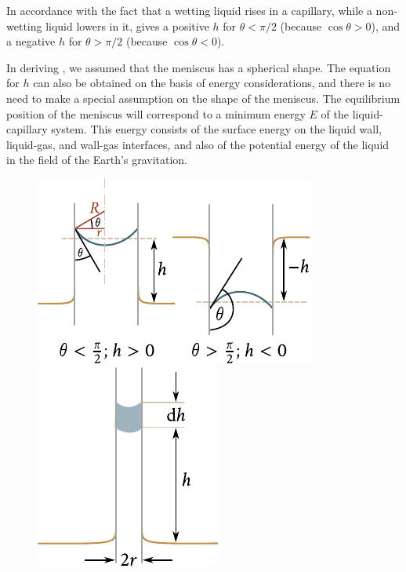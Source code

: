 In accordance with the fact that a wetting liquid rises in a capillary, while a non-wetting liquid lowers in it,  gives a positive $h$ for $\theta<\pi/2$ (because $\cos\theta>0$), and a negative $h$ for $\theta>\pi/2$ (because $\cos\theta<0$).

In deriving , we assumed that the meniscus has a spherical shape. The equation for $h$ can also be obtained on the basis of energy considerations, and there is no need to make a special assumption on the shape of the meniscus. The equilibrium position of the meniscus will correspond to a minimum energy $E$ of the liquid-capillary system. This energy consists of the surface energy on the liquid wall, liquid-gas, and wall-gas interfaces, and also of the potential energy of the liquid in the field of the Earth's gravitation.

\begin{figure}[t]
	\begin{minipage}[t]{0.5\linewidth}
		\begin{center}
			\includegraphics[scale=0.95]{figures/ch_14/fig_14_12.pdf}
			\caption[]{}
			\label{fig:14_12}
		\end{center}
	\end{minipage}
	\hspace{-0.05cm}
	\begin{minipage}[t]{0.5\linewidth}
		\begin{center}
			\includegraphics[scale=0.95]{figures/ch_14/fig_14_13.pdf}
			\caption[]{}
			\label{fig:14_13}
		\end{center}
	\end{minipage}
	\vspace{-0.4cm}
\end{figure}

